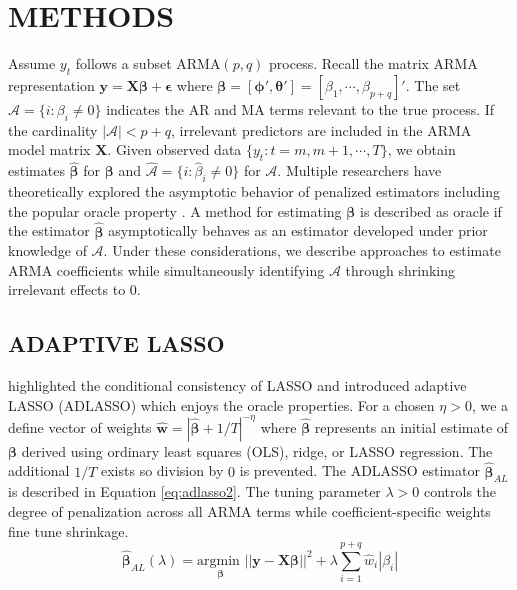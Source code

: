 \section{METHODS}
\label{sec:methods}

Assume $y_t$ follows a subset ARMA$(p,q)$ process. Recall the matrix ARMA representation $\bm{y}=\bm{X}\bm{\beta}+\bm{\epsilon}$ where $\bm{\beta}=[\bm{\phi}',\bm{\theta}']=[\beta_1,\cdots,\beta_{p+q}]'$. The set $\mathcal{A}=\{i:\beta_i\neq 0\}$ indicates the AR and MA terms relevant to the true process. If the cardinality $|\mathcal{A}|<p+q$, irrelevant predictors are included in the ARMA model matrix $\bm{X}$. Given observed data $\{y_t: t=m,m+1,\cdots,T\}$, we obtain estimates $\hat{\bm{\beta}}$ for $\bm{\beta}$ and $\hat{\mathcal{A}}=\{i:\hat{\beta}_i\neq 0\}$ for $\mathcal{A}$. Multiple researchers have theoretically explored the asymptotic behavior of penalized estimators including the popular oracle property \citep{Fan2001,Fan2004,Fan2011}. A method for estimating $\bm{\beta}$ is described as oracle if the estimator $\hat{\bm{\beta}}$ asymptotically behaves as an estimator developed under prior knowledge of $\mathcal{A}$. Under these considerations, we describe approaches to estimate ARMA coefficients while simultaneously identifying $\mathcal{A}$ through shrinking irrelevant effects to 0.

\subsection{ADAPTIVE LASSO}

\cite{Zou2006} highlighted the conditional consistency of LASSO and introduced adaptive LASSO (ADLASSO) which enjoys the oracle properties. For a chosen $\eta>0$, we a define vector of weights $\hat{\bm{w}}=|\hat{\bm{\beta}}+1/T|^{-\eta}$ where $\hat{\bm{\beta}}$ represents an initial estimate of $\bm{\beta}$ derived using ordinary least squares (OLS), ridge, or LASSO regression. The additional $1/T$ exists so division by $0$ is prevented. The ADLASSO estimator $\hat{\bm{\beta}}_{AL}$ is described in Equation \ref{eq:adlasso2}. The tuning parameter $\lambda>0$ controls the degree of penalization across all ARMA terms while coefficient-specific weights fine tune shrinkage.
\begin{equation}
\label{eq:adlasso2}
\hat{\bm{\beta}}_{AL} (\lambda)= \underset{\bm{\beta}}{\textrm{argmin }}  ||\bm{y}-\bm{X}\bm{\beta}||^2 + \lambda \sum\limits_{i=1}^{p+q} \hat{w}_{i}|\beta_i|
\end{equation}

